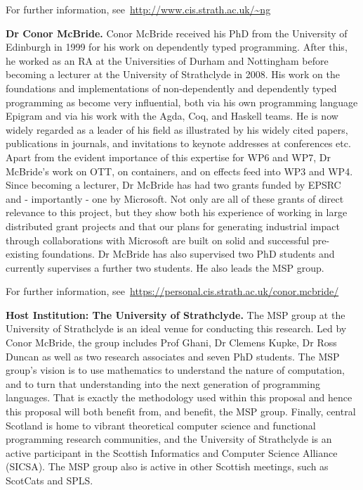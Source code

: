 \documentclass[a4paper,11pt]{article}
\begin{document}
For further information, see~\url{http://www.cis.strath.ac.uk/~ng}

\textbf{Dr Conor McBride.} Conor McBride received his PhD from the
University of Edinburgh in 1999 for his work on dependently typed
programming. After this, he worked as an RA at the Universities of
Durham and Nottingham before becoming a lecturer at the University of
Strathclyde in 2008. His work on the foundations and implementations
of non-dependently and dependently typed programming as become very
influential, both via his own programming language Epigram and via his
work with the Agda, Coq, and Haskell teams. He is now widely regarded
as a leader of his field as illustrated by his widely cited papers,
publications in journals, and invitations to keynote addresses at conferences
etc. Apart from the evident importance of this expertise for WP6 and
WP7, Dr McBride's work on OTT, on containers, and on effects feed into
WP3 and WP4. Since becoming a lecturer, Dr McBride has had two grants
funded by EPSRC and - importantly - one by Microsoft. Not only are all
of these grants of direct relevance to this project, but they
show both his experience of working in large distributed grant projects and
that our plans for generating industrial impact through collaborations
with Microsoft are built on solid and successful pre-existing
foundations. Dr McBride has also supervised two PhD students and
currently supervises a further two students. He also leads the MSP
group.

For further information,
see~\url{https://personal.cis.strath.ac.uk/conor.mcbride/}

\textbf{Host Institution: The University of Strathclyde.} The MSP
group at the University of Strathclyde is an ideal venue for
conducting this research. Led by Conor McBride, the group includes
Prof Ghani, Dr Clemens Kupke, Dr Ross Duncan as well as two research
associates and seven PhD students. The MSP group's vision is to use
mathematics to understand the nature of computation, and to turn that
understanding into the next generation of programming languages. That
is exactly the methodology used within this proposal and hence this
proposal will both benefit from, and benefit, the MSP group.
Finally, central Scotland is home to vibrant theoretical computer
science and functional programming research communities, and the
University of Strathclyde is an active participant in the Scottish
Informatics and Computer Science Alliance (SICSA). The MSP group also
is active in other Scottish meetings, such as ScotCats and SPLS.
\end{document}
